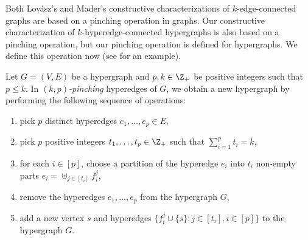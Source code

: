 Both Lov\'{a}sz's and Mader's constructive characterizations of $k$-edge-connected graphs are based on a pinching operation in graphs. Our constructive characterization of $k$-hyperedge-connected hypergraphs is also based on a pinching operation, but our pinching operation is defined for hypergraphs. We define this operation now (see  for an example). %

\begin{definition}\label{def:pinching-operation}
    Let $G = (V, E)$ be a hypergraph and $p,k \in \Z_+$ be positive integers such that $p \leq k$. In \emph{$(k, p)$-pinching} hyperedges of $G$, we obtain a new hypergraph by performing the following sequence of operations:
    \begin{enumerate}
        \item pick $p$ distinct hyperedges $e_1, \ldots, e_p \in E$,
        \item pick $p$ positive integers $t_1, \ldots, t_p \in \Z_+$ such that $\sum_{i=1}^p t_i = k$,
        \item for each $i \in [p]$, choose a partition of the hyperedge $e_i$ into $t_i$ non-empty parts $e_i = \uplus_{j \in [t_i]} f_i^j$,
        \item remove the hyperedges $e_1, \ldots, e_p$ from the hypergraph $G$,
        \item add a new vertex $s$ and hyperedges $\{f_i^j \cup \{s\} : j \in [t_i], i \in [p]\}$ to the hypergraph $G$.
    \end{enumerate}
\end{definition}

